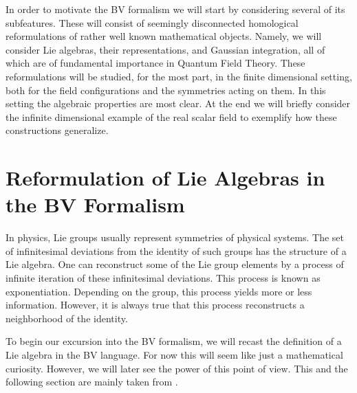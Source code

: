 In order to motivate the BV formalism we will start by considering several of its subfeatures. These will consist of seemingly disconnected homological reformulations of rather well known mathematical objects. Namely, we will consider Lie algebras, their representations, and Gaussian integration, all of which are of fundamental importance in Quantum Field Theory. These reformulations will be studied, for the most part, in the finite dimensional setting, both for the field configurations and the symmetries acting on them. In this setting the algebraic properties are most clear. At the end we will briefly consider the infinite dimensional example of the real scalar field to exemplify how these constructions generalize. 

\section{Reformulation of Lie Algebras in the BV Formalism}

In physics, Lie groups usually represent symmetries of physical systems. The set of infinitesimal deviations from the identity of such groups has the structure of a Lie algebra. One can reconstruct some of the Lie group elements by a process of infinite iteration of these infinitesimal deviations. This process is known as exponentiation. Depending on the group, this process yields more or less information. However, it is always true that this process reconstructs a neighborhood of the identity.

To begin our excursion into the BV formalism, we will recast the definition of a Lie algebra in the BV language. For now this will seem like just a mathematical curiosity. However, we will later see the power of this point of view. This and the following section are mainly taken from \cite{Fiorenza2008}.

